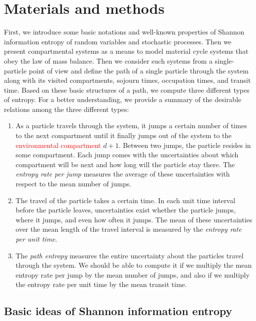 \documentclass[smallextended]{svjour3}
\newcommand{\red}[1]{\textcolor{red}{#1}}
\begin{document}
\section{Materials and methods}
First, we introduce some basic notations and well-known properties of Shannon information entropy of random variables and stochastic processes.
Then we present compartmental systems as a means to model material cycle systems that obey the law of mass balance.
Then we consider such systems from a single-particle point of view and define the path of a single particle through the system along with its visited compartments, sojourn times, occupation times, and transit time.
Based on these basic structures of a path, we compute three different types of entropy.
For a better understanding, we provide a summary of the desirable relations among the three different types:
\begin{enumerate}[(1)]
	\item As a particle travels through the system, it jumps a certain number of times to the next compartment until it finally jumps out of the system to the \red{environmental compartment} $d+1$.
	Between two jumps, the particle resides in some compartment.
	Each jump comes with the uncertainties about which compartment will be next and how long will the particle stay there.
	The \emph{entropy rate per jump} measures the average of these uncertainties with respect to the mean number of jumps.
	\item The travel of the particle takes a certain time.
	In each unit time interval before the particle leaves, uncertainties exist whether the particle jumps, where it jumps, and even how often it jumps.
	The mean of these uncertainties over the mean length of the travel interval is measured by the \emph{entropy rate per unit time}.
	\item The \emph{path entropy} measures the entire uncertainty about the particles travel through the system.
	We should be able to compute it if we multiply the mean entropy rate per jump by the mean number of jumps, and also if we multiply the entropy rate per unit time by the mean transit time.
\end{enumerate}


\subsection{Basic ideas of Shannon information entropy}
\label{sec:entropy_basics}
\end{document}
